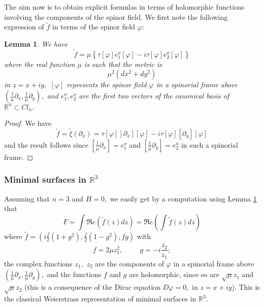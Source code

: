 \documentclass{amsart}
\newtheorem{lem}{Lemma}[section]
\begin{document}
The aim now is to obtain explicit formulas in terms of holomorphic functions involving the components of the spinor field. We first note the following expression of $\tilde{f}$ in terms of the spinor field $\varphi:$ 
\begin{lem}\label{lem expr f tilde}
We have
$$\tilde{f}=\mu\left\{\tau[\varphi]e_{1}^o[\varphi]-i\tau[\varphi]e_{2}^o[\varphi]\right\}$$
where the real function $\mu$ is such that the metric is 
$$\mu^2(dx^2+dy^2)$$
in $z=x+iy,$ $[\varphi]$ represents the spinor field $\varphi$ in a spinorial frame above $(\frac{1}{\mu}\partial_x,\frac{1}{\mu}\partial_y),$ and $e_1^o,e_2^o$ are the first two vectors of the canonical basis of ${\mathbb{R}}^n\subset Cl_n.$
\end{lem}
\begin{proof}
We have
$$\tilde{f}=\tilde{\xi}\left(\partial_x\right)=\tau[\varphi][\partial_x][\varphi]-i\tau[\varphi][\partial_y][\varphi]$$
and the result follows since $[\frac{1}{\mu}\partial_x]=e_{1}^o$ and $[\frac{1}{\mu}\partial_y]=e_2^o$ in such a spinorial frame. 
\end{proof}
\subsubsection{Minimal surfaces in ${\mathbb{R}}^3$} Assuming that $n=3$ and $H=0,$ we easily get by a computation using Lemma \ref{lem expr f tilde} that
$$F=\int\Re e(\tilde{f}(z)dz)=\Re e(\int \tilde{f}(z)dz)$$
where $ \tilde{f}=\left(i\frac{f}{2}(1+g^2),\frac{f}{2}(1-g^2),fg\right)$ with 
$$f=2\mu z_1^2,\hspace{1cm}g=-i\frac{\overline{z_2}}{z_1};$$  
the complex functions $z_1,$ $z_2$ are the components of $\varphi$ in a spinorial frame above $(\frac{1}{\mu}\partial_x,\frac{1}{\mu}\partial_y),$ and the functions $f$ and $g$ are holomorphic, since so are $\sqrt{\mu}z_1$ and  $\sqrt{\mu}\overline{z_2}$ (this is a consequence of the Dirac equation $D\varphi=0,$ in $z=x+iy$). This is the classical Weierstrass representation of minimal surfaces in ${\mathbb{R}}^3.$
\end{document}
